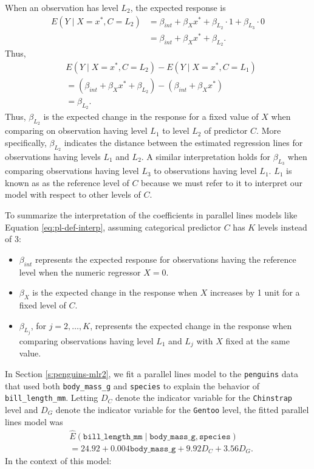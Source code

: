 \documentclass[
]{book}
\providecommand{\tightlist}{%
  \setlength{\itemsep}{0pt}\setlength{\parskip}{0pt}}
\theoremstyle{definition}
\theoremstyle{definition}
\theoremstyle{definition}
\theoremstyle{definition}
\theoremstyle{remark}
\begin{document}
When an observation has level \(L_2\), the expected response is \[
\begin{aligned}
E(Y\mid X = x^*, C=L_2) &= \beta_{int} + \beta_X x^* + \beta_{L_2} \cdot 1 + \beta_{L_3} \cdot 0 \\
&= \beta_{int} + \beta_X x^* + \beta_{L_2}.
\end{aligned}
\] Thus, \[
\begin{aligned}
& E(Y\mid X=x^*, C=L_2) - E(Y\mid X=x^*, C=L_1) \\
&= (\beta_{int} + \beta_X x^* + \beta_{L_2}) - (\beta_{int} + \beta_X x^*) \\
&=  \beta_{L_2}.
\end{aligned}
\] Thus, \(\beta_{L_2}\) is the expected change in the response for a
fixed value of \(X\) when comparing on observation having level \(L_1\) to
level \(L_2\) of predictor \(C\). More specifically, \(\beta_{L_2}\) indicates
the distance between the estimated regression lines for observations
having levels \(L_1\) and \(L_2\). A similar interpretation holds for
\(\beta_{L_3}\) when comparing observations having level \(L_3\) to
observations having level \(L_1\). \(L_1\) is known as as the reference
level of \(C\) because we must refer to it to interpret our model with
respect to other levels of \(C\).

To summarize the interpretation of the coefficients in parallel lines
models like Equation \eqref{eq:pl-def-interp}, assuming categorical
predictor \(C\) has \(K\) levels instead of 3:

\begin{itemize}
\tightlist
\item
  \(\beta_{int}\) represents the expected response for observations
  having the reference level when the numeric regressor \(X = 0\).
\item
  \(\beta_X\) is the expected change in the response when \(X\) increases
  by 1 unit for a fixed level of \(C\).
\item
  \(\beta_{L_j}\), for \(j=2,\ldots,K\), represents the expected change in
  the response when comparing observations having level \(L_1\) and
  \(L_j\) with \(X\) fixed at the same value.
\end{itemize}

In Section \ref{s:penguins-mlr2}, we fit a parallel lines model to the
\texttt{penguins} data that used both \texttt{body\_mass\_g} and \texttt{species} to explain
the behavior of \texttt{bill\_length\_mm}. Letting \(D_C\) denote the indicator
variable for the \texttt{Chinstrap} level and \(D_G\) denote the indicator
variable for the \texttt{Gentoo} level, the fitted parallel lines model was \[
\begin{aligned}
&\hat{E}(\mathtt{bill\_length\_mm} \mid \mathtt{body\_mass\_g}, \mathtt{species})\\
&= 24.92 + 0.004 \mathtt{body\_mass\_g} + 9.92 D_C + 3.56 D_G.
\end{aligned}
\] In the context of this model:
\end{document}
